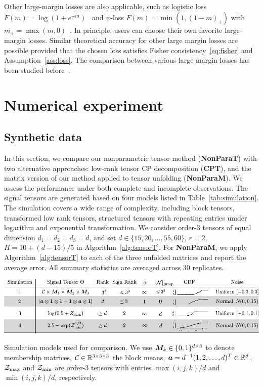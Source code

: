 \documentclass[twoside,11pt]{article}
\theoremstyle{definition}
\begin{document}
Other large-margin losses are also applicable, such as logistic loss $F(m)=\log(1+e^{-m})$~\citep{wang2018learning} and $\psi$-loss $F(m)=\min(1,(1-m)_{+})$ with $m_{+}=\max(m,0)$~\citep{shen2003psi}. In principle, users can choose their own favorite large-margin losses. Similar theoretical accuracy for other large margin losses are possible provided that the chosen loss satisfies Fisher consistency~\eqref{eq:fisher} and Assumption~\ref{ass:loss}. The comparison between various large-margin losses has been studied before~\citep{bartlett2006convexity}. 






\section{Numerical experiment}\label{sec:simulation}

\subsection{Synthetic data}
In this section, we compare our nonparametric tensor method ({\bf NonParaT}) with two alternative approaches: low-rank tensor CP decomposition ({\bf CPT}), and the matrix version of our method applied to tensor unfolding ({\bf NonParaM}). We assess the performance under both complete and incomplete observations. The signal tensors are generated based on four models listed in Table~\ref{tab:simulation}. The simulation covers a wide range of complexity, including block tensors, transformed low rank tensors, structured tensors with repeating entries umder logarithm and exponential transformation. We consider order-3  tensors of equal dimension $d_1=d_2=d_3=d$, and set $d\in \{15, 20,\ldots,55,60\}$, $r=2$, $H=10+{(d-15)/ 5}$ in Algorithm~\ref{alg:tensorT}. For {\bf NonParaM}, we apply Algorithm~\ref{alg:tensorT} to each of the three unfolded matrices and report the average error. All summary statistics are averaged across $30$ replicates.  

\begin{table}[h]
\includegraphics[width=1\textwidth]{figure/simulation.pdf}
\caption{Simulation models used for comparison. We use $\bm M_k\in\{0,1\}^{d\times 3}$ to denote membership matrices, $\mathcal{C}\in\mathbb{R}^{3\times 3\times 3}$ the block means, $\bm{a}=d^{-1}(1,2,\ldots,d)^T \in\mathbb{R}^d$, $\mathcal{Z}_{\max}$ and $\mathcal{Z}_{\min}$ are order-3 tensors with entries $\max(i,j,k)/d$ and $\min(i,j,k)/d$, respectively.}\label{tab:simulation}
\end{table}
\end{document}
